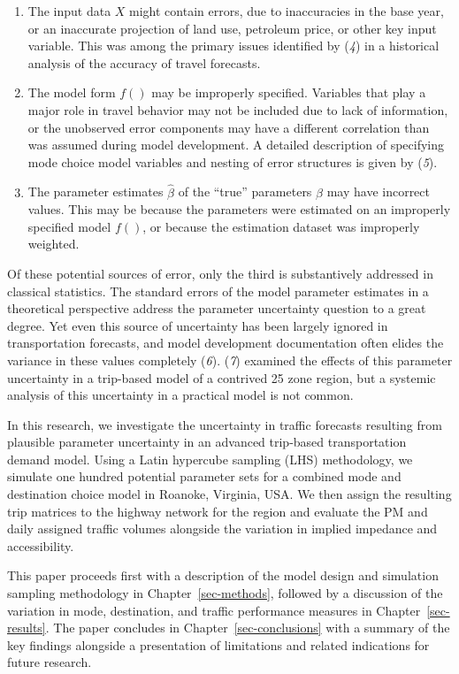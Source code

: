 \documentclass[
  letterpaper,
]{trb}
\providecommand{\tightlist}{%
  \setlength{\itemsep}{0pt}\setlength{\parskip}{0pt}}\usepackage{longtable,booktabs,array}
\begin{document}
\begin{enumerate}
\def\labelenumi{\arabic{enumi}.}
\tightlist
\item
  The input data \(X\) might contain errors, due to inaccuracies in the
  base year, or an inaccurate projection of land use, petroleum price,
  or other key input variable. This was among the primary issues
  identified by (\emph{4}) in a historical analysis of the accuracy of
  travel forecasts.
\item
  The model form \(f()\) may be improperly specified. Variables that
  play a major role in travel behavior may not be included due to lack
  of information, or the unobserved error components may have a
  different correlation than was assumed during model development. A
  detailed description of specifying mode choice model variables and
  nesting of error structures is given by (\emph{5}).
\item
  The parameter estimates \(\hat{\beta}\) of the ``true'' parameters
  \(\beta\) may have incorrect values. This may be because the
  parameters were estimated on an improperly specified model \(f()\), or
  because the estimation dataset was improperly weighted.
\end{enumerate}

Of these potential sources of error, only the third is substantively
addressed in classical statistics. The standard errors of the model
parameter estimates in a theoretical perspective address the parameter
uncertainty question to a great degree. Yet even this source of
uncertainty has been largely ignored in transportation forecasts, and
model development documentation often elides the variance in these
values completely (\emph{6}). (\emph{7}) examined the effects of this
parameter uncertainty in a trip-based model of a contrived 25 zone
region, but a systemic analysis of this uncertainty in a practical model
is not common.

In this research, we investigate the uncertainty in traffic forecasts
resulting from plausible parameter uncertainty in an advanced trip-based
transportation demand model. Using a Latin hypercube sampling (LHS)
methodology, we simulate one hundred potential parameter sets for a
combined mode and destination choice model in Roanoke, Virginia, USA. We
then assign the resulting trip matrices to the highway network for the
region and evaluate the PM and daily assigned traffic volumes alongside
the variation in implied impedance and accessibility.

This paper proceeds first with a description of the model design and
simulation sampling methodology in Chapter~\ref{sec-methods}, followed
by a discussion of the variation in mode, destination, and traffic
performance measures in Chapter~\ref{sec-results}. The paper concludes
in Chapter~\ref{sec-conclusions} with a summary of the key findings
alongside a presentation of limitations and related indications for
future research.
\end{document}
